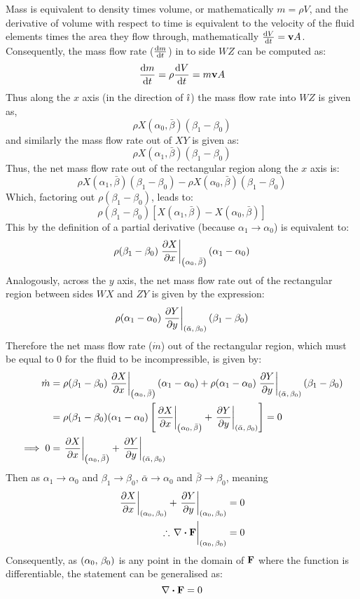 Mass is equivalent to density times volume, or mathematically $m=\rho V$, and the derivative of volume with respect to time is
equivalent to the velocity of the fluid elements times the area they flow through, mathematically $\dv{V}{t}=\mathbf{v}A$. Consequently, the mass flow rate ($\dv{m}{t}$) in to side $WZ$
can be computed as:
$$
    \dv{m}{t}=\rho\dv{V}{t}=m\mathbf{v}A
$$
Thus along the $x$ axis (in the direction of $\hat{\imath}$) the mass flow rate into $WZ$ is given as,
$$
    \rho X(\alpha_0,\bar{\beta})(\beta_1-\beta_0)
$$
and similarly the mass flow rate out of $XY$ is given as:
$$
    \rho X(\alpha_1,\bar{\beta})(\beta_1-\beta_0)
$$
Thus, the net mass flow rate out of the rectangular region along the $x$ axis is:
$$
    \rho X(\alpha_1,\bar{\beta})(\beta_1-\beta_0)-\rho X(\alpha_0,\bar{\beta})(\beta_1-\beta_0)
$$
Which, factoring out $\rho(\beta_1-\beta_0)$, leads to:
$$
    \rho(\beta_1-\beta_0)\left[X(\alpha_1,\bar{\beta})-X(\alpha_0,\bar{\beta})\right]
$$
This by the definition of a partial derivative (because $\alpha_1\rightarrow\alpha_0$) is equivalent to:
$$
    \rho(\beta_1-\beta_0)\eval{\pdv{X}{x}}_{\point{\alpha_0}{\bar{\beta}}}(\alpha_1-\alpha_0)
$$
Analogously, across the $y$ axis, the net mass flow rate out of the rectangular region between sides $WX$ and $ZY$ is given by the expression:
$$
    \rho(\alpha_1-\alpha_0)\eval{\pdv{Y}{y}}_{\point{\bar{\alpha}}{\beta_0}}(\beta_1-\beta_0)
$$
Therefore the net mass flow rate ($\dot{m}$) out of the rectangular region, which must be equal to 0 for the fluid to be incompressible, is given by:
\begin{align*}
    \dot{m}&=\rho(\beta_1-\beta_0)\eval{\pdv{X}{x}}_{\point{\alpha_0}{\bar{\beta}}}(\alpha_1-\alpha_0)+\rho(\alpha_1-\alpha_0)\eval{\pdv{Y}{y}}_{\point{\bar{\alpha}}{\beta_0}}(\beta_1-\beta_0)\\
    &=\rho(\beta_1-\beta_0)(\alpha_1-\alpha_0)\left[\eval{\pdv{X}{x}}_{\point{\alpha_0}{\bar{\beta}}}+\eval{\pdv{Y}{y}}_{\point{\bar{\alpha}}{\beta_0}}\right]=0\\
    \implies0&=\eval{\pdv{X}{x}}_{\point{\alpha_0}{\bar{\beta}}}+\eval{\pdv{Y}{y}}_{\point{\bar{\alpha}}{\beta_0}}
\end{align*}
Then as $\alpha_1\rightarrow\alpha_0$ and $\beta_1\rightarrow\beta_0$, $\bar{\alpha}\rightarrow\alpha_0$ and $\bar{\beta}\rightarrow\beta_0$, meaning
\begin{align*}
    \eval{\pdv{X}{x}}_{\point{\alpha_0}{\beta_0}}+\eval{\pdv{Y}{y}}_{\point{\alpha_0}{\beta_0}}&=0\\
    \therefore\eval{\divergence{\fatf}}_{\point{\alpha_0}{\beta_0}}&=0
\end{align*}
Consequently, as $\left(\alpha_0,\,\beta_0\right)$ is any point in the domain of $\mathbf{F}$ where the function is differentiable, the statement can be generalised as:
$$
    \divergence{\fatf}=0
$$

